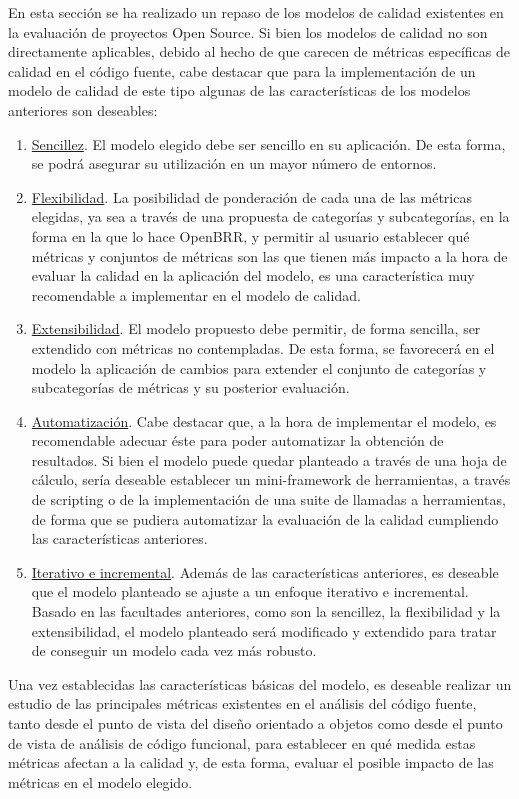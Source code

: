 \documentclass[11pt]{article}
\begin{document}
En esta sección se ha realizado un repaso de los modelos de calidad existentes en la evaluación de proyectos Open Source. Si bien los modelos de calidad no son directamente aplicables, debido al hecho de que carecen de métricas específicas de calidad en el código fuente, cabe destacar que para la implementación de un modelo de calidad de este tipo algunas de las características de los modelos anteriores son deseables:

\begin{enumerate}
\item{\underline{Sencillez}}. El modelo elegido debe ser sencillo en su aplicación. De esta forma, se podrá asegurar su utilización en un mayor número de entornos.
\item{\underline{Flexibilidad}}. La posibilidad de ponderación de cada una de las métricas elegidas, ya sea a través de una propuesta de categorías y subcategorías, en la forma en la que lo hace OpenBRR, y permitir al usuario establecer qué métricas y conjuntos de métricas son las que tienen más impacto a la hora de evaluar la calidad en la aplicación del modelo, es una característica muy recomendable a implementar en el modelo de calidad.
\item{\underline{Extensibilidad}}. El modelo propuesto debe permitir, de forma sencilla, ser extendido con métricas no contempladas. De esta forma, se favorecerá en el modelo la aplicación de cambios para extender el conjunto de categorías y subcategorías de métricas y su posterior evaluación.
\item{\underline{Automatización}}. Cabe destacar que, a la hora de implementar el modelo, es recomendable adecuar éste para poder automatizar la obtención de resultados. Si bien el modelo puede quedar planteado a través de una hoja de cálculo, sería deseable establecer un mini-framework de herramientas, a través de scripting o de la implementación de una suite de llamadas a herramientas, de forma que se pudiera automatizar la evaluación de la calidad cumpliendo las características anteriores.
\item{\underline{Iterativo e incremental}}. Además de las características anteriores, es deseable que el modelo planteado se ajuste a un enfoque iterativo e incremental. Basado en las facultades anteriores, como son la sencillez, la flexibilidad y la extensibilidad, el modelo planteado será modificado y extendido para tratar de conseguir un modelo cada vez más robusto.
\end{enumerate}

Una vez establecidas las características básicas del modelo, es deseable realizar un estudio de las principales métricas existentes en el análisis del código fuente, tanto desde el punto de vista del diseño orientado a objetos como desde el punto de vista de análisis de código funcional, para establecer en qué medida estas métricas afectan a la calidad y, de esta forma, evaluar el posible impacto de las métricas en el modelo elegido.
\end{document}
